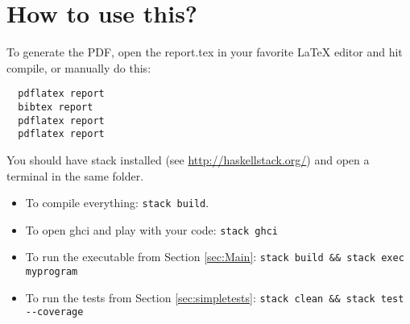 
\section{How to use this?}

To generate the PDF, open the report.tex in your favorite LaTeX editor and
hit compile, or manually do this:

\begin{verbatim}
  pdflatex report
  bibtex report
  pdflatex report
  pdflatex report
\end{verbatim}

You should have stack installed (see \url{http://haskellstack.org/}) and
open a terminal in the same folder.

\begin{itemize}
  \item To compile everything: \verb|stack build|.
  \item To open ghci and play with your code: \verb|stack ghci|
  \item To run the executable from Section \ref{sec:Main}: \verb|stack build && stack exec myprogram|
  \item To run the tests from Section \ref{sec:simpletests}: \verb|stack clean && stack test --coverage|
\end{itemize}
